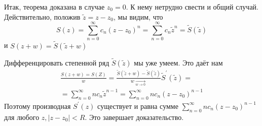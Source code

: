 \documentclass[main]{subfiles}
\begin{document}
\begin{longProof}
    Итак, теорема доказана в случае $z_0 = 0$. К нему нетрудно свести и общий случай. Действительно, положив $\tilde{z} = z - z_0$, мы видим, что
    \[S(z) = \sum^\infty_{n=0} c_n(z-z_0)^n = \sum^\infty_{n=0} c_n \tilde{z}^n = \tilde{S}(\tilde{z}) \]
    и $S(z+w) = \tilde{S}(\tilde{z} + w)$

    Дифференцировать степенной ряд $\tilde{S}(\tilde{z})$ мы уже умеем. Это даёт нам
    \begin{multline*}
        \frac{S(z+w)=S(Z)}{w} = \frac{\tilde{S}(\tilde{z} + w)-\tilde{S}(\tilde{z})}{w \underset{w \to 0}{\longrightarrow}} \tilde{S}^\prime(\tilde{z}) = \\
        =\sum^\infty_{n=0} nc_n \tilde{z}^{n-1}  = \sum^\infty_{n=0} nc_n(z-z_0)^{n-1}
    \end{multline*}
    Поэтому производная $S^\prime(z)$ существует и равна сумме $\sum^\infty_{n=0} nc_n(z-z_0)^{n-1}$ для любого
    $z, |z-z_0| < R$. Это завершает доказательство.
\end{longProof}
\end{document}

